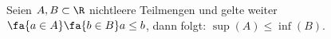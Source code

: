\begin{exercise}
  Seien $A, B \subset \R$ nichtleere Teilmengen und gelte weiter
  $\fa{a \in A} \fa{b \in B} a \leq b$, dann folgt: $\sup(A) \leq \inf(B)$.
\end{exercise}
